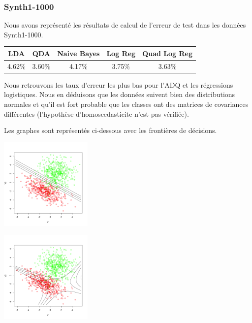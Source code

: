 \documentclass[10pt]{article}
\begin{document}
\subsubsection{Synth1-1000}
Nous avons représenté les résultats de calcul de l'erreur de test dans les données Synth1-1000. 
\begin{center}
	\begin{tabular}{|c | c | c| c| c| }
		\hline
		LDA & QDA & Naive Bayes & Log Reg & Quad Log Reg\\
		\hline	
		4.62\% & 3.60\% & 4.17\% & 3.75\% & 3.63\%
	\end{tabular}
\end{center}
Nous retrouvons les taux d'erreur les plus bas pour l'ADQ et les régressions logistiques. Nous en déduisons que les données suivent bien des distributions normales et qu'il est fort probable que les classes ont des matrices de covariances différentes (l'hypothèse d'homoscedasticite n'est pas vérifiée). 

Les graphes sont représentés ci-dessous avec les frontières de décisions.

\begin{minipage}{.5\textwidth}
	\includegraphics[width=45mm]{Figures/synth1_lda.png}
\end{minipage}%
\hspace{0.02\linewidth}
\begin{minipage}{.5\textwidth}
	\includegraphics[width=45mm]{Figures/synth1_qda.png}
\end{minipage}
\end{document}
